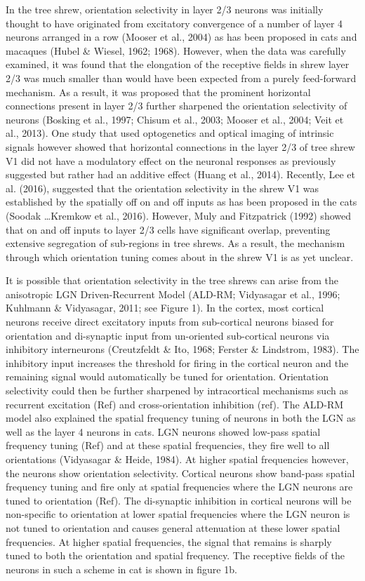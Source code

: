 In the tree shrew, orientation selectivity in layer 2/3 neurons was
initially thought to have originated from excitatory convergence of a
number of layer 4 neurons arranged in a row (Mooser et al., 2004) as has
been proposed in cats and macaques (Hubel \& Wiesel, 1962; 1968).
However, when the data was carefully examined, it was found that the
elongation of the receptive fields in shrew layer 2/3 was much smaller
than would have been expected from a purely feed-forward mechanism. As a
result, it was proposed that the prominent horizontal connections
present in layer 2/3 further sharpened the orientation selectivity of
neurons (Bosking et al., 1997; Chisum et al., 2003; Mooser et al., 2004;
Veit et al., 2013). One study that used optogenetics and optical imaging
of intrinsic signals however showed that horizontal connections in the
layer 2/3 of tree shrew V1 did not have a modulatory effect on the
neuronal responses as previously suggested but rather had an additive
effect (Huang et al., 2014). Recently, Lee et al. (2016), suggested that
the orientation selectivity in the shrew V1 was established by the
spatially off on and off inputs as has been proposed in the cats (Soodak
\ldots{}Kremkow et al., 2016). However, Muly and Fitzpatrick (1992)
showed that on and off inputs to layer 2/3 cells have significant
overlap, preventing extensive segregation of sub-regions in tree shrews.
As a result, the mechanism through which orientation tuning comes about
in the shrew V1 is as yet unclear.

It is possible that orientation selectivity in the tree shrews can arise
from the anisotropic LGN Driven-Recurrent Model (ALD-RM; Vidyasagar et
al., 1996; Kuhlmann \& Vidyasagar, 2011; see Figure 1). In the cortex,
most cortical neurons receive direct excitatory inputs from sub-cortical
neurons biased for orientation and di-synaptic input from un-oriented
sub-cortical neurons via inhibitory interneurons (Creutzfeldt \& Ito,
1968; Ferster \& Lindstrom, 1983). The inhibitory input increases the
threshold for firing in the cortical neuron and the remaining signal
would automatically be tuned for orientation. Orientation selectivity
could then be further sharpened by intracortical mechanisms such as
recurrent excitation (Ref) and cross-orientation inhibition (ref). The
ALD-RM model also explained the spatial frequency tuning of neurons in
both the LGN as well as the layer 4 neurons in cats. LGN neurons showed
low-pass spatial frequency tuning (Ref) and at these spatial
frequencies, they fire well to all orientations (Vidyasagar \& Heide,
1984). At higher spatial frequencies however, the neurons show
orientation selectivity. Cortical neurons show band-pass spatial
frequency tuning and fire only at spatial frequencies where the LGN
neurons are tuned to orientation (Ref). The di-synaptic inhibition in
cortical neurons will be non-specific to orientation at lower spatial
frequencies where the LGN neuron is not tuned to orientation and causes
general attenuation at these lower spatial frequencies. At higher
spatial frequencies, the signal that remains is sharply tuned to both
the orientation and spatial frequency. The receptive fields of the
neurons in such a scheme in cat is shown in figure 1b.

